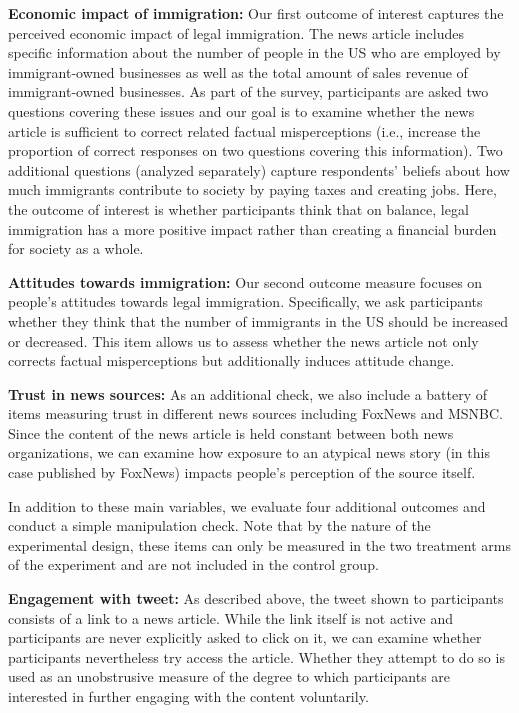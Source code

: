 \documentclass[
]{article}
\begin{document}
\textbf{Economic impact of immigration:} Our first outcome of interest
captures the perceived economic impact of legal immigration. The news
article includes specific information about the number of people in the
US who are employed by immigrant-owned businesses as well as the total
amount of sales revenue of immigrant-owned businesses. As part of the
survey, participants are asked two questions covering these issues and
our goal is to examine whether the news article is sufficient to correct
related factual misperceptions (i.e., increase the proportion of correct
responses on two questions covering this information). Two additional
questions (analyzed separately) capture respondents' beliefs about how
much immigrants contribute to society by paying taxes and creating jobs.
Here, the outcome of interest is whether participants think that on
balance, legal immigration has a more positive impact rather than
creating a financial burden for society as a whole.

\textbf{Attitudes towards immigration:} Our second outcome measure
focuses on people's attitudes towards legal immigration. Specifically,
we ask participants whether they think that the number of immigrants in
the US should be increased or decreased. This item allows us to assess
whether the news article not only corrects factual misperceptions but
additionally induces attitude change.

\textbf{Trust in news sources:} As an additional check, we also include
a battery of items measuring trust in different news sources including
FoxNews and MSNBC. Since the content of the news article is held
constant between both news organizations, we can examine how exposure to
an atypical news story (in this case published by FoxNews) impacts
people's perception of the source itself.

In addition to these main variables, we evaluate four additional
outcomes and conduct a simple manipulation check. Note that by the
nature of the experimental design, these items can only be measured in
the two treatment arms of the experiment and are not included in the
control group.

\textbf{Engagement with tweet:} As described above, the tweet shown to
participants consists of a link to a news article. While the link itself
is not active and participants are never explicitly asked to click on
it, we can examine whether participants nevertheless try access the
article. Whether they attempt to do so is used as an unobstrusive
measure of the degree to which participants are interested in further
engaging with the content voluntarily.
\end{document}

